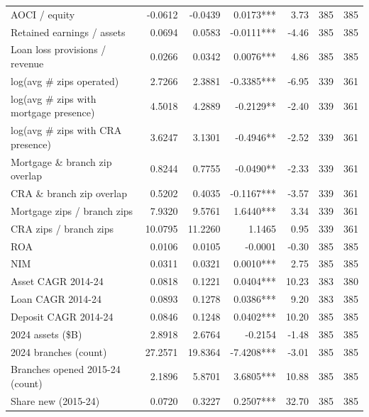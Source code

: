\begin{tabular}{lrrrrrr}
AOCI / equity & -0.0612 & -0.0439 & 0.0173*** & 3.73 & 385 & 385 \\
Retained earnings / assets & 0.0694 & 0.0583 & -0.0111*** & -4.46 & 385 & 385 \\
Loan loss provisions / revenue & 0.0266 & 0.0342 & 0.0076*** & 4.86 & 385 & 385 \\
log(avg \# zips operated) & 2.7266 & 2.3881 & -0.3385*** & -6.95 & 339 & 361 \\
log(avg \# zips with mortgage presence) & 4.5018 & 4.2889 & -0.2129** & -2.40 & 339 & 361 \\
log(avg \# zips with CRA presence) & 3.6247 & 3.1301 & -0.4946** & -2.52 & 339 & 361 \\
Mortgage \& branch zip overlap & 0.8244 & 0.7755 & -0.0490** & -2.33 & 339 & 361 \\
CRA \& branch zip overlap & 0.5202 & 0.4035 & -0.1167*** & -3.57 & 339 & 361 \\
Mortgage zips / branch zips & 7.9320 & 9.5761 & 1.6440*** & 3.34 & 339 & 361 \\
CRA zips / branch zips & 10.0795 & 11.2260 & 1.1465 & 0.95 & 339 & 361 \\
ROA & 0.0106 & 0.0105 & -0.0001 & -0.30 & 385 & 385 \\
NIM & 0.0311 & 0.0321 & 0.0010*** & 2.75 & 385 & 385 \\
Asset CAGR 2014-24 & 0.0818 & 0.1221 & 0.0404*** & 10.23 & 383 & 380 \\
Loan CAGR 2014-24 & 0.0893 & 0.1278 & 0.0386*** & 9.20 & 383 & 385 \\
Deposit CAGR 2014-24 & 0.0846 & 0.1248 & 0.0402*** & 10.20 & 385 & 385 \\
2024 assets (\$B) & 2.8918 & 2.6764 & -0.2154 & -1.48 & 385 & 385 \\
2024 branches (count) & 27.2571 & 19.8364 & -7.4208*** & -3.01 & 385 & 385 \\
Branches opened 2015-24 (count) & 2.1896 & 5.8701 & 3.6805*** & 10.88 & 385 & 385 \\
Share new (2015-24) & 0.0720 & 0.3227 & 0.2507*** & 32.70 & 385 & 385 \\
\bottomrule
\end{tabular}

